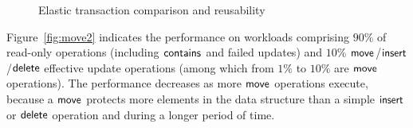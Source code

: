 \begin{figure}[t]
	\begin{center}
	\hspace{1em}
	\caption{Elastic transaction comparison and reusability}
	\end{center}
\end{figure}

Figure~\ref{fig:move2} indicates the performance on workloads comprising $90\%$ of read-only operations (including $\act{contains}$ and failed updates) and $10\%$ $\act{move}$/$\act{insert}$/$\act{delete}$ effective update operations (among which from $1\%$ to $10\%$ are $\act{move}$ operations).
The performance decreases as more 
$\act{move}$ operations execute, because a $\act{move}$ protects more elements in the data structure 
than a simple $\act{insert}$ or $\act{delete}$ operation and during a longer period of time.  

